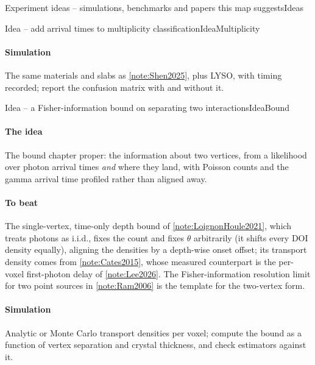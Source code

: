 \begin{programnote}{Experiment ideas -- simulations, benchmarks and papers this map suggests}{Ideas}
\begin{papernote}{Idea -- add arrival times to multiplicity classification}{IdeaMultiplicity}
\paragraph{Simulation}
The same materials and slabs as \ref{note:Shen2025}, plus LYSO, with timing
recorded; report the confusion matrix with and without it.
\end{papernote}

\begin{papernote}{Idea -- a Fisher-information bound on separating two interactions}{IdeaBound}
\paragraph{The idea}
The bound chapter proper: the information about two vertices, from a likelihood
over photon arrival times \emph{and} where they land, with Poisson counts and
the gamma arrival time profiled rather than aligned away.

\paragraph{To beat}
The single-vertex, time-only depth bound of \ref{note:LoignonHoule2021}, which
treats photons as i.i.d., fixes the count and fixes $\theta$ arbitrarily (it
shifts every DOI density equally), aligning the densities by a depth-wise onset
offset;
its transport density comes from \ref{note:Cates2015}, whose measured
counterpart is the per-voxel first-photon delay of \ref{note:Lee2026}. The
Fisher-information resolution limit for two point sources in
\ref{note:Ram2006} is the template for the two-vertex form.

\paragraph{Simulation}
Analytic or Monte Carlo transport densities per voxel; compute the bound as a
function of vertex separation and crystal thickness, and check estimators
against it.


\end{papernote}
\end{programnote}

